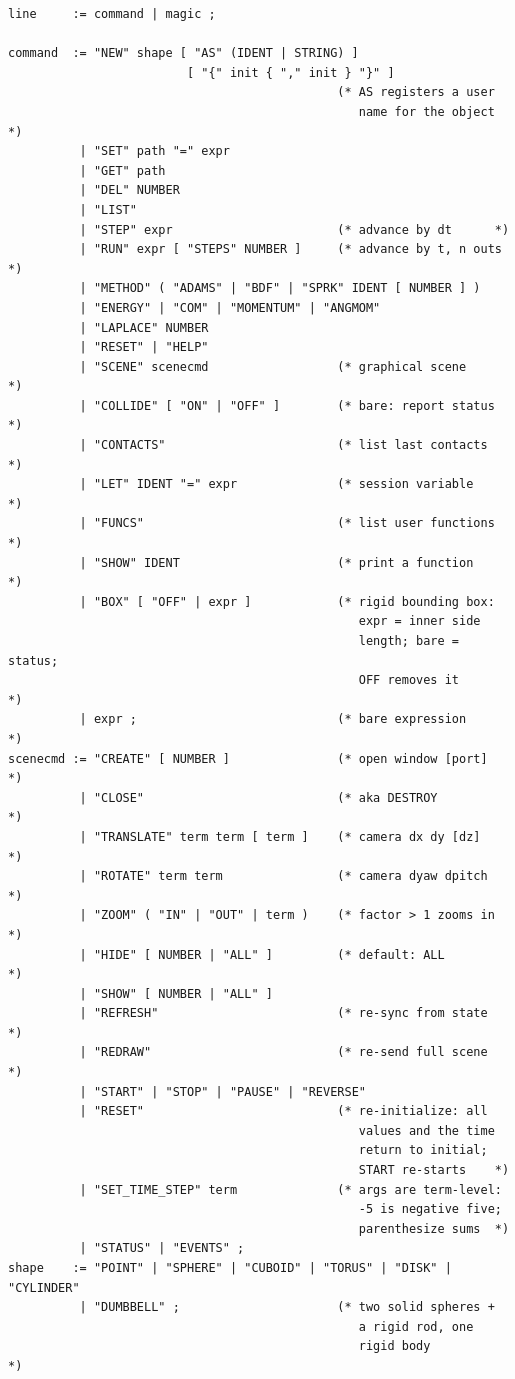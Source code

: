 \documentclass[11pt]{article}
\begin{document}
\begin{lstlisting}
line     := command | magic ;

command  := "NEW" shape [ "AS" (IDENT | STRING) ]
                         [ "{" init { "," init } "}" ]
                                              (* AS registers a user
                                                 name for the object *)
          | "SET" path "=" expr
          | "GET" path
          | "DEL" NUMBER
          | "LIST"
          | "STEP" expr                       (* advance by dt      *)
          | "RUN" expr [ "STEPS" NUMBER ]     (* advance by t, n outs *)
          | "METHOD" ( "ADAMS" | "BDF" | "SPRK" IDENT [ NUMBER ] )
          | "ENERGY" | "COM" | "MOMENTUM" | "ANGMOM"
          | "LAPLACE" NUMBER
          | "RESET" | "HELP"
          | "SCENE" scenecmd                  (* graphical scene     *)
          | "COLLIDE" [ "ON" | "OFF" ]        (* bare: report status *)
          | "CONTACTS"                        (* list last contacts  *)
          | "LET" IDENT "=" expr              (* session variable    *)
          | "FUNCS"                           (* list user functions *)
          | "SHOW" IDENT                      (* print a function    *)
          | "BOX" [ "OFF" | expr ]            (* rigid bounding box:
                                                 expr = inner side
                                                 length; bare = status;
                                                 OFF removes it      *)
          | expr ;                            (* bare expression     *)
scenecmd := "CREATE" [ NUMBER ]               (* open window [port]  *)
          | "CLOSE"                           (* aka DESTROY         *)
          | "TRANSLATE" term term [ term ]    (* camera dx dy [dz]   *)
          | "ROTATE" term term                (* camera dyaw dpitch  *)
          | "ZOOM" ( "IN" | "OUT" | term )    (* factor > 1 zooms in *)
          | "HIDE" [ NUMBER | "ALL" ]         (* default: ALL        *)
          | "SHOW" [ NUMBER | "ALL" ]
          | "REFRESH"                         (* re-sync from state  *)
          | "REDRAW"                          (* re-send full scene  *)
          | "START" | "STOP" | "PAUSE" | "REVERSE"
          | "RESET"                           (* re-initialize: all
                                                 values and the time
                                                 return to initial;
                                                 START re-starts    *)
          | "SET_TIME_STEP" term              (* args are term-level:
                                                 -5 is negative five;
                                                 parenthesize sums  *)
          | "STATUS" | "EVENTS" ;
shape    := "POINT" | "SPHERE" | "CUBOID" | "TORUS" | "DISK" | "CYLINDER"
          | "DUMBBELL" ;                      (* two solid spheres +
                                                 a rigid rod, one
                                                 rigid body          *)


\end{lstlisting}
\end{document}
